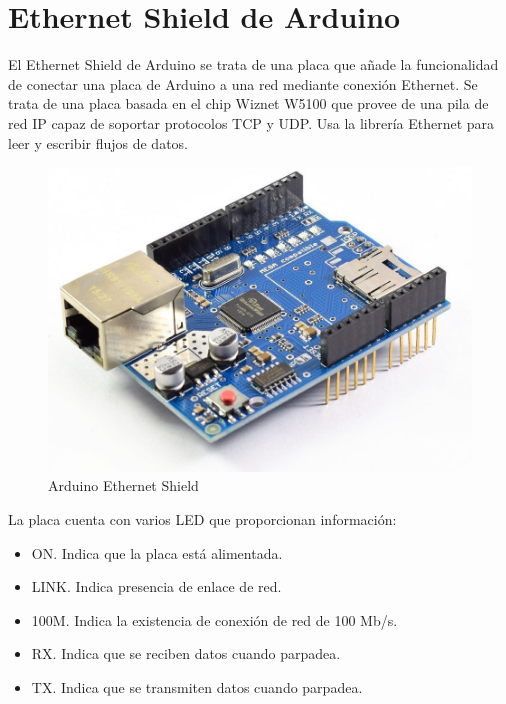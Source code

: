 \section{Ethernet Shield de Arduino}

El Ethernet Shield de Arduino se trata de una placa que añade
la funcionalidad de conectar una placa de Arduino a una red 
mediante conexión Ethernet. Se trata de una placa basada en
el chip Wiznet W5100 que provee de una pila de red IP capaz de
soportar protocolos TCP y UDP. Usa la librería Ethernet para leer y 
escribir flujos de datos.

\begin{figure}[hbtp]
	\centering
	\includegraphics[scale=1]{02-hardware/02-shield-ethernet-w5100.jpg}
	\caption{Arduino Ethernet Shield}
	\label{fig:figura22}
	\end{figure}

La placa cuenta con varios LED que proporcionan información:
\begin{itemize}
    \item ON. Indica que la placa está alimentada.
    \item LINK. Indica presencia de enlace de red.
    \item 100M. Indica la existencia de conexión de red de 100 Mb/s.
    \item RX. Indica que se reciben datos cuando parpadea.
    \item TX. Indica que se transmiten datos cuando parpadea.
\end{itemize}

